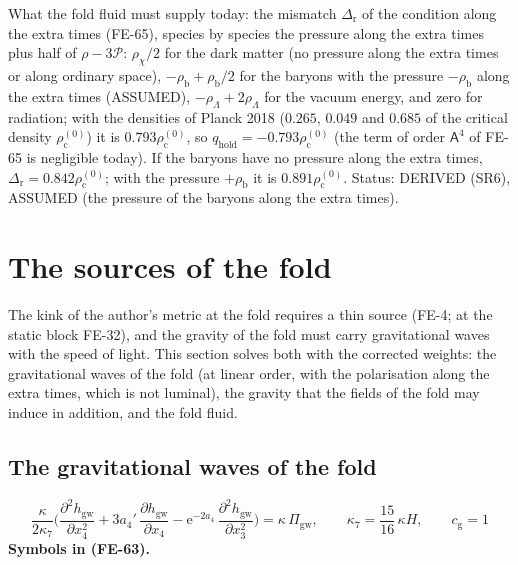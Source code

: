 \documentclass[
  10pt,
]{article}
\begin{document}
What the fold fluid must supply today: the mismatch
\(\Delta_{\mathrm{r}}\) of the condition along the extra times (FE-65),
species by species the pressure along the extra times plus half of
\(\rho - 3\mathcal{P}\): \(\rho_\chi/2\) for the dark matter (no
pressure along the extra times or along ordinary space),
\(-\rho_{\mathrm{b}} + \rho_{\mathrm{b}}/2\) for the baryons with the
pressure \(-\rho_{\mathrm{b}}\) along the extra times (ASSUMED),
\(-\rho_\Lambda + 2\rho_\Lambda\) for the vacuum energy, and zero for
radiation; with the densities of Planck 2018 (\(0.265\), \(0.049\) and
\(0.685\) of the critical density \(\rho_{\mathrm{c}}^{(0)}\)) it is
\(0.793\rho_{\mathrm{c}}^{(0)}\), so
\(q_{\mathrm{hold}} = -0.793\rho_{\mathrm{c}}^{(0)}\) (the term of order
\(\mathsf{A}^4\) of FE-65 is negligible today). If the baryons have no
pressure along the extra times,
\(\Delta_{\mathrm{r}} = 0.842\rho_{\mathrm{c}}^{(0)}\); with the
pressure \(+\rho_{\mathrm{b}}\) it is \(0.891\rho_{\mathrm{c}}^{(0)}\).
Status: DERIVED (SR6), ASSUMED (the pressure of the baryons along the
extra times).

\hypertarget{the-sources-of-the-fold}{%
\section{The sources of the fold}\label{the-sources-of-the-fold}}

The kink of the author's metric at the fold requires a thin source
(FE-4; at the static block FE-32), and the gravity of the fold must
carry gravitational waves with the speed of light. This section solves
both with the corrected weights: the gravitational waves of the fold (at
linear order, with the polarisation along the extra times, which is not
luminal), the gravity that the fields of the fold may induce in
addition, and the fold fluid.

\hypertarget{the-gravitational-waves-of-the-fold}{%
\subsection{The gravitational waves of the
fold}\label{the-gravitational-waves-of-the-fold}}

\[
\frac{\kappa}{2\kappa_7}\Big(\frac{\partial^2h_{\mathrm{gw}}}{\partial x_4^2} + 3a_4'\,\frac{\partial h_{\mathrm{gw}}}{\partial x_4}
 - \mathrm{e}^{-2a_4}\,\frac{\partial^2h_{\mathrm{gw}}}{\partial x_3^2}\Big) = \kappa\,\Pi_{\mathrm{gw}},\qquad
\kappa_7 = \frac{15}{16}\,\kappa H,\qquad c_{\mathrm{g}} = 1 \tag{FE-63}
\] \textbf{Symbols in (FE-63).}
\end{document}
